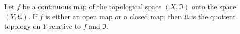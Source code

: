 Let $f$ be a continuous map of the topological space $(X, \mathfrak{I})$ onto the space $(Y, \mathfrak{U})$. If $f$ is either an open map or a closed map, then $\mathfrak{U}$ is the quotient topology on $Y$ relative to $f$ and $\mathfrak{I}$.
